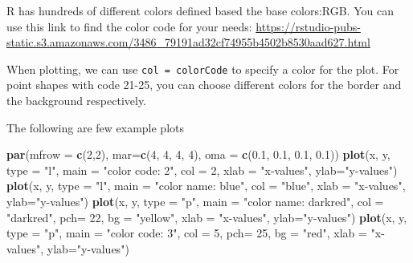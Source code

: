 \documentclass[
]{book}
\newenvironment{Shaded}{\begin{snugshade}}{\end{snugshade}}
\newcommand{\AttributeTok}[1]{\textcolor[rgb]{0.13,0.29,0.53}{#1}}
\newcommand{\DecValTok}[1]{\textcolor[rgb]{0.00,0.00,0.81}{#1}}
\newcommand{\FloatTok}[1]{\textcolor[rgb]{0.00,0.00,0.81}{#1}}
\newcommand{\FunctionTok}[1]{\textcolor[rgb]{0.13,0.29,0.53}{\textbf{#1}}}
\newcommand{\NormalTok}[1]{#1}
\newcommand{\StringTok}[1]{\textcolor[rgb]{0.31,0.60,0.02}{#1}}
\begin{document}
R has hundreds of different colors defined based the base colors:RGB. You can use this link to find the color code for your needs: \url{https://rstudio-pubs-static.s3.amazonaws.com/3486_79191ad32cf74955b4502b8530aad627.html}

When plotting, we can use \texttt{col\ =\ colorCode} to specify a color for the plot. For point shapes with code 21-25, you can choose different colors for the border and the background respectively.

The following are few example plots

\begin{Shaded}
\begin{Highlighting}[]
\FunctionTok{par}\NormalTok{(}\AttributeTok{mfrow =} \FunctionTok{c}\NormalTok{(}\DecValTok{2}\NormalTok{,}\DecValTok{2}\NormalTok{), }\AttributeTok{mar=}\FunctionTok{c}\NormalTok{(}\DecValTok{4}\NormalTok{, }\DecValTok{4}\NormalTok{, }\DecValTok{4}\NormalTok{, }\DecValTok{4}\NormalTok{), }\AttributeTok{oma =} \FunctionTok{c}\NormalTok{(}\FloatTok{0.1}\NormalTok{, }\FloatTok{0.1}\NormalTok{, }\FloatTok{0.1}\NormalTok{, }\FloatTok{0.1}\NormalTok{))}
\FunctionTok{plot}\NormalTok{(x, y, }\AttributeTok{type =} \StringTok{"l"}\NormalTok{, }\AttributeTok{main =} \StringTok{"color code: 2"}\NormalTok{,  }\AttributeTok{col =} \DecValTok{2}\NormalTok{,         }
     \AttributeTok{xlab =} \StringTok{"x{-}values"}\NormalTok{, }\AttributeTok{ylab=}\StringTok{"y{-}values"}\NormalTok{)}
\FunctionTok{plot}\NormalTok{(x, y, }\AttributeTok{type =} \StringTok{"l"}\NormalTok{, }\AttributeTok{main =} \StringTok{"color name: blue"}\NormalTok{,    }\AttributeTok{col =} \StringTok{"blue"}\NormalTok{,    }
     \AttributeTok{xlab =} \StringTok{"x{-}values"}\NormalTok{, }\AttributeTok{ylab=}\StringTok{"y{-}values"}\NormalTok{)}
\FunctionTok{plot}\NormalTok{(x, y, }\AttributeTok{type =} \StringTok{"p"}\NormalTok{, }\AttributeTok{main =} \StringTok{"color name: darkred"}\NormalTok{, }\AttributeTok{col =} \StringTok{"darkred"}\NormalTok{, }\AttributeTok{pch=} \DecValTok{22}\NormalTok{,  }
     \AttributeTok{bg =} \StringTok{"yellow"}\NormalTok{, }\AttributeTok{xlab =} \StringTok{"x{-}values"}\NormalTok{, }\AttributeTok{ylab=}\StringTok{"y{-}values"}\NormalTok{)}
\FunctionTok{plot}\NormalTok{(x, y, }\AttributeTok{type =} \StringTok{"p"}\NormalTok{, }\AttributeTok{main =} \StringTok{"color code: 3"}\NormalTok{,  }\AttributeTok{col =} \DecValTok{5}\NormalTok{, }\AttributeTok{pch=} \DecValTok{25}\NormalTok{,  }\AttributeTok{bg =} \StringTok{"red"}\NormalTok{,   }
     \AttributeTok{xlab =} \StringTok{"x{-}values"}\NormalTok{, }\AttributeTok{ylab=}\StringTok{"y{-}values"}\NormalTok{)}
\end{Highlighting}
\end{Shaded}
\end{document}

